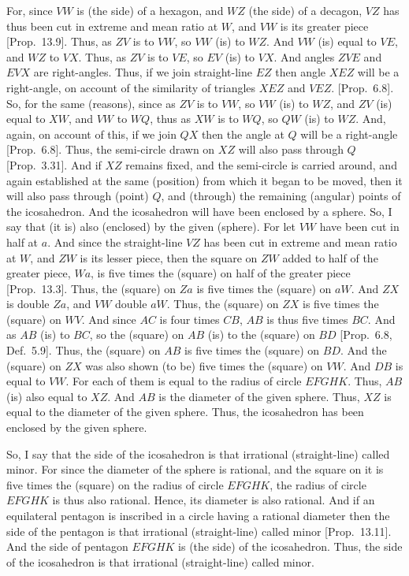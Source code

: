 \begin{Parallel}{}{}
{For, since $VW$ is (the side) of a hexagon, and $WZ$ (the side) of
a decagon, $VZ$ has thus been cut in extreme and mean
ratio at $W$, and $VW$ is its greater piece  [Prop.~13.9]. Thus, as
$ZV$ is to $VW$, so $VW$ (is) to $WZ$. And $VW$ (is) equal
to $VE$, and $WZ$ to $VX$.  Thus, as $ZV$ is to $VE$,
so $EV$ (is) to $VX$. And angles $ZVE$ and
$EVX$ are right-angles. Thus, if we join straight-line $EZ$ then angle
$XEZ$ will be a right-angle, on account of the similarity of triangles
$XEZ$ and $VEZ$.  [Prop.~6.8]. So, for the same (reasons), since
as $ZV$ is to $VW$, so $VW$ (is) to $WZ$,  and $ZV$ (is) equal to
$XW$, and $VW$ to $WQ$, thus as $XW$ is to $WQ$, so $QW$
(is) to $WZ$. And, again, on account of this,  if we join $QX$ then the
angle at $Q$ will be a right-angle [Prop.~6.8]. Thus, the semi-circle
drawn on $XZ$ will also pass through $Q$ [Prop.~3.31]. And if $XZ$ remains
fixed, and the semi-circle is carried around, and again established at
the same (position) from which it began to be moved, then it will
also pass through (point) $Q$, and (through) the remaining (angular) points
of the icosahedron. And the icosahedron will have been enclosed by a sphere.
 So, I say that (it is) also (enclosed) by the given (sphere). 
 For let $VW$ have been cut in half at $a$. And since the straight-line $VZ$ has been cut in extreme and mean ratio at $W$, and  $ZW$ is its lesser piece,
 then the square on $ZW$ added to half of the greater piece, $Wa$, is
 five times the (square) on half of the greater piece [Prop.~13.3]. 
 Thus, the (square) on $Za$ is five times the (square) on $aW$. And
 $ZX$ is double $Za$, and $VW$ double $aW$. Thus,
 the (square) on $ZX$ is five times the (square) on $WV$. And since
 $AC$ is four times $CB$, $AB$ is thus five times $BC$. And as
 $AB$ (is) to $BC$, so the (square) on $AB$ (is) to the
 (square) on $BD$ [Prop.~6.8, Def.~5.9]. Thus, the (square)
 on $AB$ is five times the (square) on $BD$. And the (square) on 
 $ZX$ was also shown (to be) five times the (square) on $VW$. 
 And $DB$ is equal to $VW$. For each of them is equal to the
 radius of circle $EFGHK$.  Thus, $AB$ (is) also equal to
 $XZ$.  And $AB$ is the diameter of the given sphere. Thus,
 $XZ$ is equal to the diameter of the given sphere. Thus, the icosahedron
 has been enclosed by the given sphere.
 
 So, I say that the side of the icosahedron is that irrational (straight-line)
 called minor. For since the diameter of the sphere is rational, and the
 square on it is five times the (square) on the radius of circle
 $EFGHK$, the radius of circle $EFGHK$ is thus also rational.
 Hence, its diameter is also rational. And if an equilateral
 pentagon is inscribed in a circle having a rational diameter then
 the side of the pentagon is that irrational (straight-line) called minor [Prop.~13.11]. And the side of pentagon $EFGHK$ is (the side)
 of the icosahedron. Thus, the side of the icosahedron is that irrational
 (straight-line) called minor.}
\end{Parallel}

